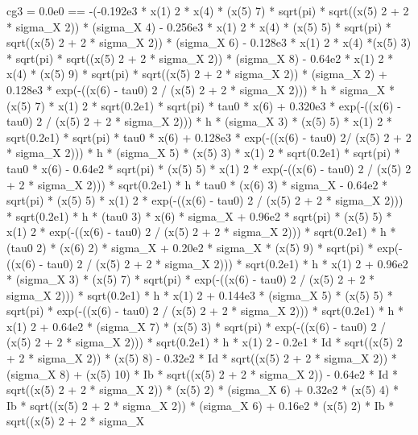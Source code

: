 \begin{maplegroup}
cg3 = 0.0e0 == -(-0.192e3 * x(1)  2 * x(4) * (x(5)  7) * sqrt(pi) * sqrt((x(5)  2 + 2 * sigma\_X  2)) * (sigma\_X  4) - 0.256e3 * x(1)  2 * x(4) * (x(5)  5) * sqrt(pi) * sqrt((x(5)  2 + 2 * sigma\_X  2)) * (sigma\_X  6) - 0.128e3 * x(1)  2 * x(4) *(x(5)  3) * sqrt(pi) * sqrt((x(5)  2 + 2 * sigma\_X  2)) * (sigma\_X  8) - 0.64e2 * x(1)  2 * x(4) * (x(5)  9) * sqrt(pi) * sqrt((x(5)  2 + 2 * sigma\_X  2)) * (sigma\_X  2) + 0.128e3 * exp(-((x(6) - tau0)  2 / (x(5)  2 + 2 * sigma\_X  2))) * h * sigma\_X * (x(5)  7) * x(1)  2 * sqrt(0.2e1) * sqrt(pi) * tau0 * x(6) + 0.320e3 * exp(-((x(6) - tau0)  2 / (x(5)  2 + 2 * sigma\_X  2))) * h * (sigma\_X  3) * (x(5)  5) * x(1)  2 * sqrt(0.2e1) * sqrt(pi) * tau0 * x(6) + 0.128e3 * exp(-((x(6) - tau0)  2/ (x(5)  2 + 2 * sigma\_X  2))) * h * (sigma\_X  5) * (x(5)  3) * x(1)  2 * sqrt(0.2e1) * sqrt(pi) * tau0 * x(6) - 0.64e2 * sqrt(pi) * (x(5)  5) * x(1)  2 * exp(-((x(6) - tau0)  2 / (x(5)  2 + 2 * sigma\_X  2))) * sqrt(0.2e1) * h * tau0 * (x(6)  3) * sigma\_X - 0.64e2 * sqrt(pi) * (x(5)  5) * x(1)  2 * exp(-((x(6) - tau0)  2 / (x(5)  2 + 2 * sigma\_X  2))) * sqrt(0.2e1) * h * (tau0  3) * x(6) * sigma\_X + 0.96e2 * sqrt(pi) * (x(5)  5) * x(1)  2 * exp(-((x(6) - tau0)  2 / (x(5)  2 + 2 * sigma\_X  2))) * sqrt(0.2e1) * h * (tau0  2) * (x(6)  2) * sigma\_X + 0.20e2 * sigma\_X * (x(5)  9) * sqrt(pi) * exp(-((x(6) - tau0)  2 / (x(5)  2 + 2 * sigma\_X  2))) * sqrt(0.2e1) * h * x(1)  2 + 0.96e2 * (sigma\_X  3) * (x(5)  7) * sqrt(pi) * exp(-((x(6) - tau0)  2 / (x(5)  2 + 2 * sigma\_X  2))) * sqrt(0.2e1) * h * x(1)  2 + 0.144e3 * (sigma\_X  5) * (x(5)  5) * sqrt(pi) * exp(-((x(6) - tau0)  2 / (x(5)  2 + 2 * sigma\_X  2))) * sqrt(0.2e1) * h * x(1)  2 + 0.64e2 * (sigma\_X  7) * (x(5)  3) * sqrt(pi) * exp(-((x(6) - tau0)  2 / (x(5)  2 + 2 * sigma\_X  2))) * sqrt(0.2e1) * h * x(1)  2 - 0.2e1 * Id * sqrt((x(5)  2 + 2 * sigma\_X  2)) * (x(5)  8) - 0.32e2 * Id * sqrt((x(5)  2 + 2 * sigma\_X  2)) * (sigma\_X  8) + (x(5)  10) * Ib * sqrt((x(5) 2 + 2 * sigma\_X  2)) - 0.64e2 * Id * sqrt((x(5)  2 + 2 * sigma\_X  2)) * (x(5)  2) * (sigma\_X  6) + 0.32e2 * (x(5)  4) * Ib * sqrt((x(5)  2 + 2 * sigma\_X  2)) * (sigma\_X  6) + 0.16e2 * (x(5)  2) * Ib * sqrt((x(5)  2 + 2 * sigma\_X  
\end{maplegroup}
